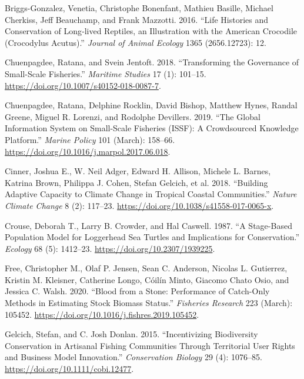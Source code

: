 \documentclass[
]{article}
\newlength{\cslhangindent}
\newlength{\cslentryspacingunit} %
\newenvironment{CSLReferences}[2] %
 {%
  \setlength{\parindent}{0pt}
  \ifodd #1
  \let\oldpar\par
  \def\par{\hangindent=\cslhangindent\oldpar}
  \fi
  \setlength{\parskip}{#2\cslentryspacingunit}
 }%
 {}
\begin{document}
\begin{CSLReferences}{1}{0}
\leavevmode{}%
Briggs-Gonzalez, Venetia, Christophe Bonenfant, Mathieu Basille, Michael Cherkiss, Jeff Beauchamp, and Frank Mazzotti. 2016. {``Life Histories and Conservation of Long‐lived Reptiles, an Illustration with the {American} Crocodile ({Crocodylus} Acutus).''} \emph{Journal of Animal Ecology} 1365 (2656.12723): 12.

\leavevmode{}%
Chuenpagdee, Ratana, and Svein Jentoft. 2018. {``Transforming the Governance of Small-Scale Fisheries.''} \emph{Maritime Studies} 17 (1): 101--15. \url{https://doi.org/10.1007/s40152-018-0087-7}.

\leavevmode{}%
Chuenpagdee, Ratana, Delphine Rocklin, David Bishop, Matthew Hynes, Randal Greene, Miguel R. Lorenzi, and Rodolphe Devillers. 2019. {``The Global Information System on Small-Scale Fisheries ({ISSF}): {A} Crowdsourced Knowledge Platform.''} \emph{Marine Policy} 101 (March): 158--66. \url{https://doi.org/10.1016/j.marpol.2017.06.018}.

\leavevmode{}%
Cinner, Joshua E., W. Neil Adger, Edward H. Allison, Michele L. Barnes, Katrina Brown, Philippa J. Cohen, Stefan Gelcich, et al. 2018. {``Building Adaptive Capacity to Climate Change in Tropical Coastal Communities.''} \emph{Nature Climate Change} 8 (2): 117--23. \url{https://doi.org/10.1038/s41558-017-0065-x}.

\leavevmode{}%
Crouse, Deborah T., Larry B. Crowder, and Hal Caswell. 1987. {``A {Stage}-{Based} {Population} {Model} for {Loggerhead} {Sea} {Turtles} and {Implications} for {Conservation}.''} \emph{Ecology} 68 (5): 1412--23. \url{https://doi.org/10.2307/1939225}.

\leavevmode{}%
Free, Christopher M., Olaf P. Jensen, Sean C. Anderson, Nicolas L. Gutierrez, Kristin M. Kleisner, Catherine Longo, Cóilín Minto, Giacomo Chato Osio, and Jessica C. Walsh. 2020. {``Blood from a Stone: {Performance} of Catch-Only Methods in Estimating Stock Biomass Status.''} \emph{Fisheries Research} 223 (March): 105452. \url{https://doi.org/10.1016/j.fishres.2019.105452}.

\leavevmode{}%
Gelcich, Stefan, and C. Josh Donlan. 2015. {``Incentivizing Biodiversity Conservation in Artisanal Fishing Communities Through Territorial User Rights and Business Model Innovation.''} \emph{Conservation Biology} 29 (4): 1076--85. \url{https://doi.org/10.1111/cobi.12477}.


\end{CSLReferences}
\end{document}
